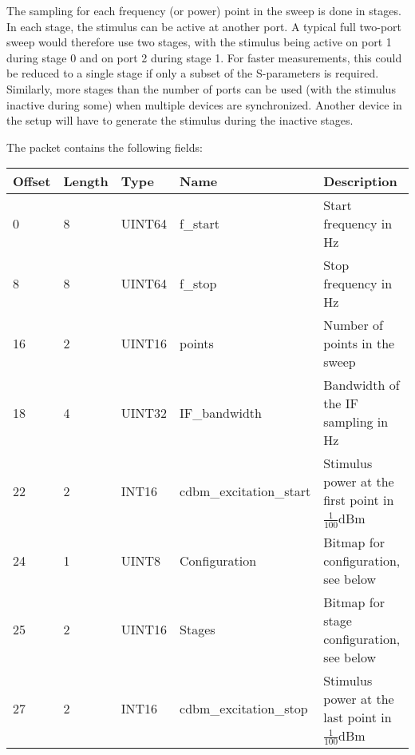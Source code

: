 \documentclass[a4paper,11pt]{article}
\begin{document}
The sampling for each frequency (or power) point in the sweep is done in stages. In each stage, the stimulus can be active at another port. A typical full two-port sweep would therefore use two stages, with the stimulus being active on port 1 during stage 0 and on port 2 during stage 1. For faster measurements, this could be reduced to a single stage if only a subset of the S-parameters is required. Similarly, more stages than the number of ports can be used (with the stimulus inactive during some) when multiple devices are synchronized. Another device in the setup will have to generate the stimulus during the inactive stages.


The packet contains the following fields:
\begin{ThreePartTable}
\setlength\tabcolsep{3pt}

\begin{longtable}{p{} |  p{}  |  p{}| p{} | p{}}
\toprule
\textbf{Offset} &\textbf{Length} &\textbf{Type} & \textbf{Name} &\textbf{Description} \\ 
\hline
\endhead
\midrule[\heavyrulewidth]
\endfoot  
\midrule[\heavyrulewidth]
\endlastfoot

0 & 8 & UINT64 & f\_start & Start frequency in Hz \\
8 & 8 & UINT64 & f\_stop & Stop frequency in Hz \\
16 & 2 & UINT16 & points & Number of points in the sweep \\
18 & 4 & UINT32 & IF\_bandwidth & Bandwidth of the IF sampling in Hz \\
22 & 2 &  INT16 &cdbm\_excitation\_start &  Stimulus power at the first point in $\frac{1}{100}$dBm \\
24 & 1 & UINT8 & Configuration & Bitmap for configuration, see below \\
25 & 2 & UINT16 & Stages & Bitmap for stage configuration, see below \\
27 & 2 &  INT16 &cdbm\_excitation\_stop & Stimulus power at the last point in $\frac{1}{100}$dBm \\
\end{longtable}   
\end{ThreePartTable}
\end{document}
